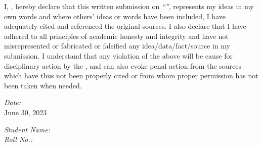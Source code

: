 
\begin{declaration}
    \addchaptertocentry{\authorshipname} %
    
    \noindent I, \authorname, hereby declare that this written submission on \textit{\enquote{\ttitle}}, represents my ideas in my own words and where others' ideas or words have been included, I have adequately cited and referenced the original sources. I also declare that I have adhered to all principles of academic honesty and integrity and have not misrepresented or fabricated or falsified any idea/data/fact/source in my submission. I understand that any violation of the above will be cause for disciplinary action by the \emph{\univname}, and can also evoke penal action from the sources which have thus not been properly cited or from whom proper permission has not been taken when needed.


    \vspace{0.2\textwidth}
    \noindent \begin{minipage}[t]{0.5\textwidth}
        \begin{flushleft}
            \large
            \emph{Date:}\\ \vspace{0.03\textwidth}
            June 30, 2023%
        \end{flushleft}
    \end{minipage}
    \begin{minipage}[t]{0.5\textwidth}
        \begin{flushright}
            \large
            \emph{Student Name:} \authorname\\ \vspace{0.03\textwidth}
            \emph{Roll No.:} \matnumber
        \end{flushright}
    \end{minipage}
\end{declaration}
